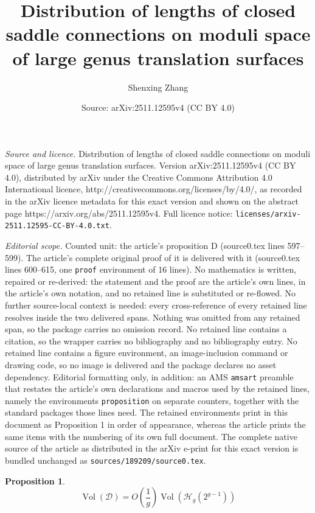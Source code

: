 \documentclass[10pt,a4paper]{amsart}
\title{Distribution of lengths of closed saddle connections on moduli space of large genus translation surfaces}
\author{Shenxing Zhang}
\date{Source: arXiv:2511.12595v4 (CC BY 4.0)}
\newtheorem{proposition}{Proposition}
\renewcommand\H{{\mathcal H}}
\newcommand{\V}{\operatorname{Vol}}
\begin{document}
\maketitle

\noindent\emph{Source and licence.} Distribution of lengths of closed saddle connections on moduli space of large genus translation surfaces. Version arXiv:2511.12595v4 (CC BY 4.0), distributed by arXiv under the Creative Commons Attribution 4.0 International licence, http://creativecommons.org/licenses/by/4.0/, as recorded in the arXiv licence metadata for this exact version and shown on the abstract page https://arxiv.org/abs/2511.12595v4. Full licence notice: \texttt{licenses/arxiv-2511.12595-CC-BY-4.0.txt}.\par\smallskip

\noindent\textit{Editorial scope.} Counted unit: the article's proposition D (source0.tex lines 597--599). The article's complete original proof of it is delivered with it (source0.tex lines 600--615, one \texttt{proof} environment of 16 lines). No mathematics is written, repaired or re-derived: the statement and the proof are the article's own lines, in the article's own notation, and no retained line is substituted or re-flowed.  No further source-local context is needed: every cross-reference of every retained line resolves inside the two delivered spans.  Nothing was omitted from any retained span, so the package carries no omission record.  No retained line contains a citation, so the wrapper carries no bibliography and no bibliography entry.  No retained line contains a figure environment, an image-inclusion command or drawing code, so no image is delivered and the package declares no asset dependency.  Editorial formatting only, in addition: an AMS \texttt{amsart} preamble that restates the article's own declarations and macros used by the retained lines, namely the environments \texttt{proposition} on separate counters, together with the standard packages those lines need.  The retained environments print in this document as Proposition 1 in order of appearance, whereas the article prints the same items with the numbering of its own full document.  The complete native source of the article as distributed in the arXiv e-print for this exact version is bundled unchanged as \texttt{sources/189209/source0.tex}.
\begin{proposition}\label{D}
$$\V(\mathcal{D})=O(\frac{1}{g})\V(\H_g(2^{g-1}))$$
\end{proposition}
\end{document}
